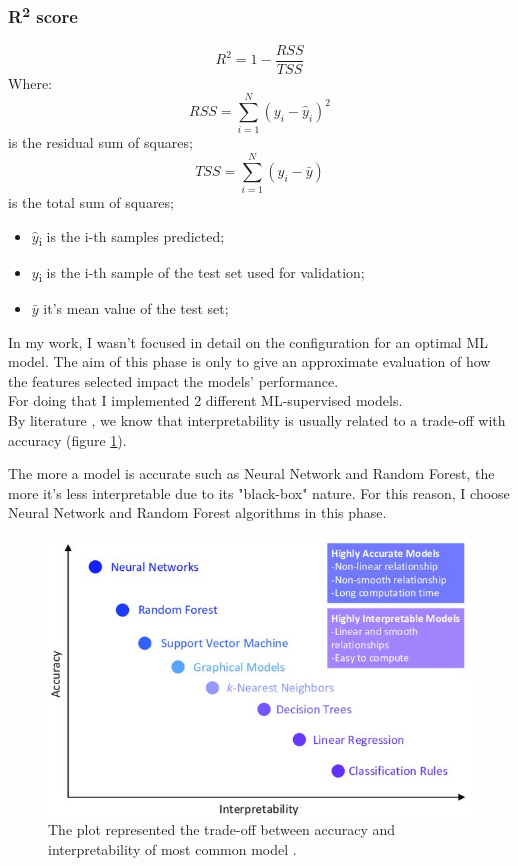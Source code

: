 \subsubsection{R\textsuperscript{2} score}
\begin{equation}
R^2 = 1 - \frac{RSS}{TSS}    
\end{equation}
Where:
\begin{equation}RSS = \sum_{i=1}^{N}(y_i-\hat{y}_i)^2 \end{equation}is the residual sum of squares;
\begin{equation} TSS =  \sum_{i=1}^{N}(y_i-\bar{y})\end{equation} is the total sum of squares;
\begin{itemize}
    \item $\hat{y}$\textsubscript{i} is the i-th samples predicted;
    \item $y$\textsubscript{i} is the i-th sample of the test set used for validation;
    \item $\bar{y}$ it's mean value of the test set;
\end{itemize}
\bigbreak\bigbreak
In my work, I wasn't focused in detail on the configuration for an optimal ML model. The aim of this phase is only to give an approximate evaluation of how the features selected impact the models' performance. \\
For doing that I implemented 2 different ML-supervised models.\\
By literature \cite{morocho2019machine}, we know that interpretability is usually related to a trade-off with accuracy (figure \ref{fig:trade-off}).\par
The more a model is accurate such as Neural Network and Random Forest, the more it's less interpretable due to its "black-box" nature. 
For this reason, I choose Neural Network and Random Forest algorithms in this phase.

\begin{figure}[H]
    \centering
    \includegraphics[scale=1.4]{images/interpretability_accuracy_tradeoff.jpg}
    \caption{The plot represented the trade-off between accuracy and interpretability of most common model \cite{morocho2019machine}.}
    \label{fig:trade-off}
\end{figure}
